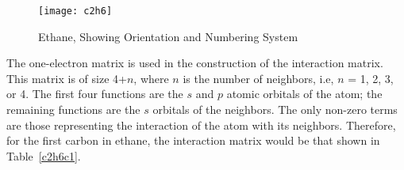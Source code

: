 \begin{figure}
\begin{makeimage}
\end{makeimage}
\texttt{[image: c2h6]}
\caption{\label{c2h6pic} Ethane, Showing Orientation and Numbering System}
\end{figure}

The one-electron matrix is used in the construction of the interaction matrix.
This matrix is of size 4+$n$, where $n$ is the number of neighbors, i.e, $n$ =
1, 2, 3, or 4.  The first four functions are the $s$ and $p$ atomic orbitals
of the atom; the remaining functions are the $s$ orbitals of the neighbors.
The only non-zero terms are those representing the interaction of the 
atom with its neighbors.  Therefore, for the first carbon in ethane, the
interaction matrix would be that shown in Table~\ref{c2h6c1}.

